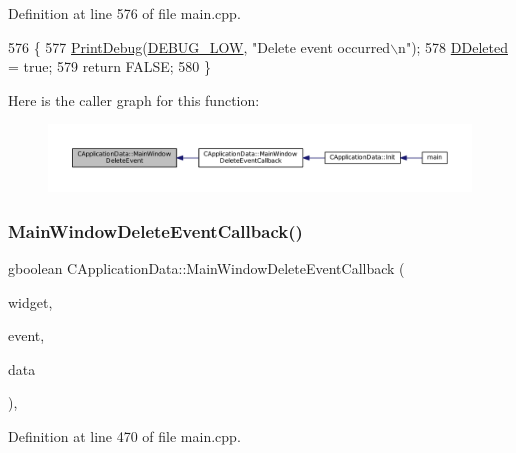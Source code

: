 Definition at line 576 of file main.\+cpp.


\begin{DoxyCode}
576                                                                                   \{
577     \hyperlink{Debug_8h_aa5f00f5537c9760f6ae1782460748ab9}{PrintDebug}(\hyperlink{Debug_8h_a3a5f3fc09784650d8388cb854882f840}{DEBUG\_LOW}, \textcolor{stringliteral}{"Delete event occurred\(\backslash\)n"});   
578     \hyperlink{classCApplicationData_a0a8651f95f3d48befd6e02a286ecdc82}{DDeleted} = \textcolor{keyword}{true};
579     \textcolor{keywordflow}{return} FALSE;    
580 \}
\end{DoxyCode}
Here is the caller graph for this function\+:
\nopagebreak
\begin{figure}[H]
\begin{center}
\leavevmode
\includegraphics[width=350pt]{classCApplicationData_afd73780d7dca117edbe341cb3c908c04_icgraph}
\end{center}
\end{figure}
\hypertarget{classCApplicationData_a4b2110c03e030cf11b733955963f8854}{}\label{classCApplicationData_a4b2110c03e030cf11b733955963f8854} 
\subsubsection{\texorpdfstring{Main\+Window\+Delete\+Event\+Callback()}{MainWindowDeleteEventCallback()}}
{\footnotesize\ttfamily gboolean C\+Application\+Data\+::\+Main\+Window\+Delete\+Event\+Callback (\begin{DoxyParamCaption}\item[{Gtk\+Widget $\ast$}]{widget,  }\item[{Gdk\+Event $\ast$}]{event,  }\item[{gpointer}]{data }\end{DoxyParamCaption})\hspace{0.3cm}{\ttfamily [static]}, {\ttfamily [protected]}}



Definition at line 470 of file main.\+cpp.


